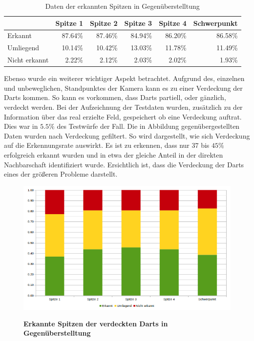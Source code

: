 \begin{table}[htbp]
\caption{Daten der erkannten Spitzen in Gegenüberstelltung}
\begin{tabular}{|l|r|r|r|r|r|}
\hline
 & \multicolumn{1}{l|}{Spitze 1} & \multicolumn{1}{l|}{Spitze 2} & \multicolumn{1}{l|}{Spitze 3} & \multicolumn{1}{l|}{Spitze 4} & \multicolumn{1}{l|}{Schwerpunkt} \\ \hline
Erkannt & 87.64\% & 87.46\% & 84.94\% & 86.20\% & 86.58\% \\ \hline
Umliegend & 10.14\% & 10.42\% & 13.03\% & 11.78\% & 11.49\% \\ \hline
Nicht erkannt & 2.22\% & 2.12\% & 2.03\% & 2.02\% & 1.93\% \\ \hline
\end{tabular}
\label{Tab:plaindata}
\end{table}

Ebenso wurde ein weiterer wichtiger Aspekt betrachtet. Aufgrund des, einzelnen und unbeweglichen, Standpunktes der Kamera kann es zu einer Verdeckung der Darts kommen. So kann es vorkommen, dass Darts partiell, oder gänzlich, verdeckt werden. Bei der Aufzeichnung der Testdaten wurden, zusätzlich zu der Information über das real erzielte Feld, gespeichert ob eine Verdeckung auftrat. Dies war in $5.5\%$ des Testwürfe der Fall.
Die in Abbildung  gegenübergestellten Daten wurden nach Verdeckung gefiltert. So wird dargestellt, wie sich Verdeckung auf die Erkennungsrate auswirkt. Es ist zu erkennen, dass nur $37$ bis $45\%$ erfolgreich erkannt wurden und in etwa der gleiche Anteil in der direkten Nachbarschaft identifiziert wurde. 
Ersichtlich ist, dass die Verdeckung der Darts eines der größeren Probleme darstellt.

\begin{figure}[ht]
\centering
\includegraphics[width=\textwidth]{media/chartonlycovert}\\
\caption{\textbf{Erkannte Spitzen der verdeckten Darts in Gegenüberstelltung}}
\label{Fig:chartcovert}
\end{figure}

